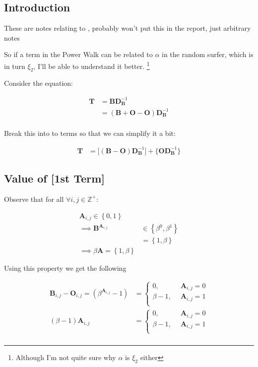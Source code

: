 \documentclass[11pt]{article}
\begin{document}
\subsection{Introduction}
\label{sec:orgccbe72c}
These are notes relating to \cite[]{parkPowerWalkRevisiting2013}, probably won't put this in the report, just arbitrary notes

So if a term in the Power Walk can be related to \(\alpha\) in the random
surfer, which is in turn \(\xi_2\), I'll be able to understand it better. \footnote{Although I'm not quite sure why \(\alpha\) is \(\xi_{2}\) either}

Consider the equation:


\begin{align*}
\mathbf{T}&= \mathbf{B}\mathbf{D}_{\mathbf{B}}^{- 1} \\
&= \left( \mathbf{B}+  \mathbf{O} - \mathbf{O} \right) \mathbf{D}_{\mathbf{B}}^{- 1} \\
\end{align*}


Break this into to terms so that we can simplify it a bit:


\begin{align*}
    \mathbf{T} &= \Bigg[ \left( \mathbf{B}- \mathbf{O} \right)\mathbf{D}_{\mathbf{B}}^{- 1} \Bigg] + \Bigg\{  \mathbf{O}\mathbf{D}_{\mathbf{B}}^{- 1} \Bigg\}
\end{align*}
\subsection{Value of [1st Term]}
\label{value-of-1st-term}
Observe that for all \(\forall i,j\in \mathbb{Z}^+\):


\begin{align*}
\mathbf{A}_{i, j} \in \left\{0, 1\right\} \\
\implies  \mathbf{B}^{\mathbf{A}_{i, j}} &\in \left\{\beta^0, \beta^1\right\} \\
                     &= \left\{1, \beta \right\}  \\
                      \implies  \beta \mathbf{A} = \left\{1, \beta \right\}
\end{align*}


Using this property we get the following


\begin{align*}
\mathbf{B}_{i,j}- \mathbf{O}_{i,j} = \left( \beta^{\mathbf{A}_{i,j}} -1 \right) &=
\begin{cases}
    0      , &\enspace \mathbf{A}_{i,j}=0  \\
    \beta-1, &\enspace \mathbf{A}_{i,j}=1  \\
\end{cases} \\
\left( \beta- 1 \right) \mathbf{A}_{i,j} &=
\begin{cases}
    0      , &\enspace \mathbf{A}_{i,j}=0  \\
    \beta-1, &\enspace \mathbf{A}_{i,j}=1  \\
\end{cases} \\
\end{align*}
\end{document}
